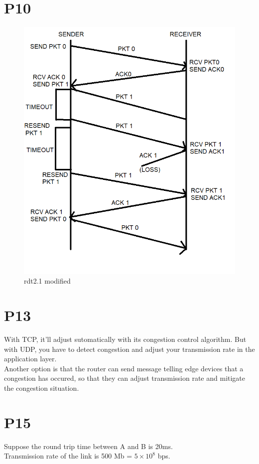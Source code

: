 \documentclass[11pt,a4paper]{article}
\begin{document}
\section{P10}
\begin{figure}[H]
    \includegraphics[width=\linewidth]{./rdt2.1_sender_timeout.png}
    \caption{rdt2.1 modified}
    \label{rdt_sender}
\end{figure}

\section{P13}
With TCP, it'll adjust sutomatically with its congestion control algorithm. But with UDP, you have to detect congestion 
and adjust your transmission rate in the application layer. \\
Another option is that the router can send message telling edge devices that a congestion has occured, so that they can
adjust transmission rate and mitigate the congestion situation.

\section{P15}
Suppose the round trip time between A and B is 20ms. \\
Transmission rate of the link is 500 Mb = $5 \times 10^8$ bps.
\end{document}
